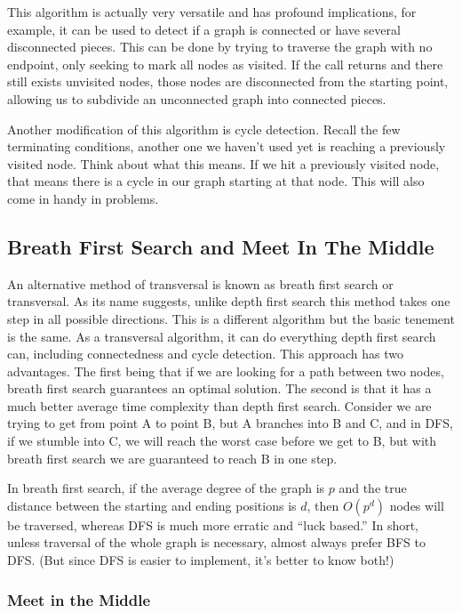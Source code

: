 \documentclass[12 pt, twoside] {article}
\begin{document}
{This algorithm is actually very versatile and has profound implications, for
example, it can be used to detect if a graph is connected or have several
disconnected pieces. This can be done by trying to traverse the graph with no
endpoint, only seeking to mark all nodes as visited. If the call returns and
there still exists unvisited nodes, those nodes are disconnected from the
starting point, allowing us to subdivide an unconnected graph into connected
pieces.

Another modification of this algorithm is cycle detection. Recall the few
terminating conditions, another one we haven't used yet is reaching a previously
visited node. Think about what this means. If we hit a previously visited node,
that means there is a cycle in our graph starting at that node. This will also
come in handy in problems.

\subsection*{Breath First Search and Meet In The Middle}

An alternative method of transversal is known as breath first search or
transversal. As its name suggests, unlike depth first search this method takes
one step in all possible directions. This is a different algorithm but the basic
tenement is the same. As a transversal algorithm, it can do everything depth
first search can, including connectedness and cycle detection. This approach has
two advantages. The first being that if we are looking for a path between two
nodes, breath first search guarantees an optimal solution. The second is that it
has a much better average time complexity than depth first search. Consider we
are trying to get from point A to point B, but A branches into B and C, and in
DFS, if we stumble into C, we will reach the worst case before we get to B, but
with breath first search we are guaranteed to reach B in one step.

In breath first search, if the average degree of the graph is $p$ and the true
distance between the starting and ending positions is $d$, then $O(p^d)$ nodes
will be traversed, whereas DFS is much more erratic and ``luck based.'' In
short, unless traversal of the whole graph is necessary, almost always prefer
BFS to DFS. (But since DFS is easier to implement, it's better to know both!)

\subsubsection*{Meet in the Middle}

}
\end{document}
